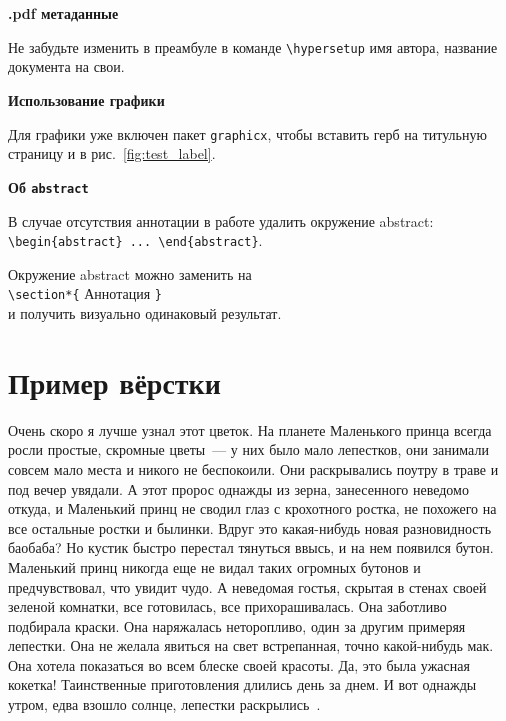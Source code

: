 \documentclass[14pt, a4paper, titlepage]{extarticle}
\renewenvironment{abstract}{\clearpage\section*{\MakeUppercase{\abstractname}}}{}
\begin{document}
\begin{abstract}
    \textbf{.pdf метаданные}
    
    Не забудьте изменить в преамбуле в команде \verb"\hypersetup" имя автора, название документа на свои.
    
    \textbf{Использование графики}
    
    Для графики уже включен пакет \texttt{graphicx}, чтобы вставить герб на титульную страницу и в рис.~\ref{fig:test_label}.

    \textbf{Об \texttt{abstract}}
    
    В случае отсутствия аннотации в работе удалить окружение abstract: \\\verb"\begin{abstract} ... \end{abstract}".
    
    Окружение abstract можно заменить на \\ \verb"\section*{" Аннотация \verb"}" \\ и получить визуально одинаковый результат.
\end{abstract}

\clearpage
\tableofcontents

\section{Пример вёрстки}

Очень скоро я лучше узнал этот цветок. На планете Маленького принца всегда росли простые, скромные цветы~--- у них было мало лепестков, они занимали совсем мало места и никого не беспокоили. Они раскрывались поутру в траве и под вечер увядали. А этот пророс однажды из зерна, занесенного неведомо откуда, и Маленький принц не сводил глаз с крохотного ростка, не похожего на все остальные ростки и былинки. Вдруг это какая-нибудь новая разновидность баобаба? Но кустик быстро перестал тянуться ввысь, и на нем появился бутон. Маленький принц никогда еще не видал таких огромных бутонов и предчувствовал, что увидит чудо. А неведомая гостья, скрытая в стенах своей зеленой комнатки, все готовилась, все прихорашивалась. Она заботливо подбирала краски. Она наряжалась неторопливо, один за другим примеряя лепестки. Она не желала явиться на свет встрепанная, точно какой-нибудь мак. Она хотела показаться во всем блеске своей красоты. Да, это была ужасная кокетка! Таинственные приготовления длились день за днем. И вот однажды утром, едва взошло солнце, лепестки раскрылись~\cite{bib:prince}.
\end{document}
